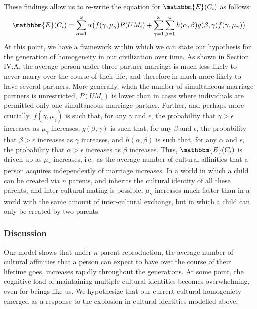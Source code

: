 These findings allow us to re-write the equation for $\mathbbm{E}(C_{i})$ as follows:\ 
\begin{equation}
    \mathbbm{E}(C_{i})=\sum_{\alpha=1}^{\omega}\alpha\big(f(\gamma,\mu_{\gamma})P(UM_{i}) + \sum_{\gamma=1}^{\omega}\sum_{\beta=1}^{\omega} h(\alpha,\beta)g(\beta,\gamma)f(\gamma,\mu_{\gamma})\big)
\end{equation}
At this point, we have a framework within which we can state our hypothesis for the generation of homogeneity in our civilization over time. As shown in Section IV.A, the average person under three-partner marriage is much less likely to never marry over the course of their life, and therefore in much more likely to have several partners. More generally, when the number of simultaneous marriage partners is unrestricted, $P(UM_{i})$ is lower than in cases where individuals are permitted only one simultaneous marriage partner. Further, and perhaps more crucially, $f(\gamma,\mu_{\gamma})$ is such that, for any $\gamma$ and $\epsilon$, the probability that $\gamma>\epsilon$ increases as $\mu_{\gamma}$ increases, $g(\beta,\gamma)$ is such that, for any $\beta$ and $\epsilon$, the probability that $\beta>\epsilon$ increases as $\gamma$ increases, and $h(\alpha,\beta)$ is such that, for any $\alpha$ and $\epsilon$, the probability that $\alpha>\epsilon$ increases as $\beta$ increases. Thus, $\mathbbm{E}(C_{i})$ is driven up as $\mu_{\gamma}$ increases, i.e.\ as the average number of cultural affinities that a person acquires independently of marriage increases. In a world in which a child can be created via $n$ parents, and inherits the cultural identity of all these parents, and inter-cultural mating is possible, $\mu_{\gamma}$ increases much faster than in a world with the same amount of inter-cultural exchange, but in which a child can only be created by two parents.\par 

\subsubsection{Discussion}
Our model shows that under $n$-parent reproduction, the average number of cultural affinities that a person can expect to have over the course of their lifetime goes, increases rapidly throughout the generations. At some point, the cognitive load of maintaining multiple cultural identities becomes overwhelming, even for beings like us. We hypothesize that our current cultural homogeniety emerged as a response to the explosion in cultural identities modelled above.\par 


